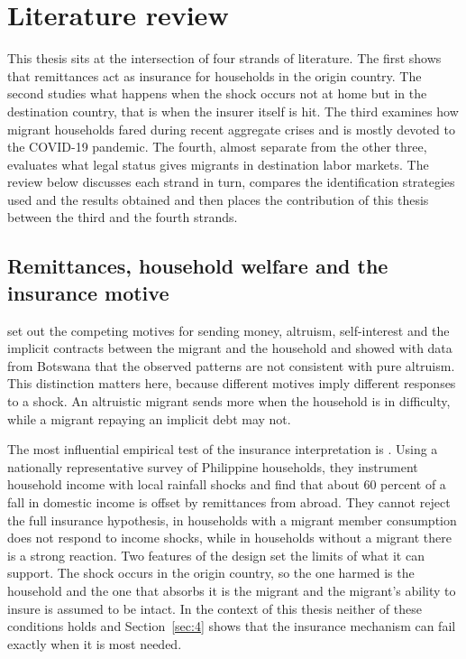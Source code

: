 \section{Literature review}\label{sec:2}

This thesis sits at the intersection of four strands of literature. The first shows that remittances act as insurance for households in the origin country. The second studies what happens when the shock occurs not at home but in the destination country, that is when the insurer itself is hit. The third examines how migrant households fared during recent aggregate crises and is mostly devoted to the COVID-19 pandemic. The fourth, almost separate from the other three, evaluates what legal status gives migrants in destination labor markets. The review below discusses each strand in turn, compares the identification strategies used and the results obtained and then places the contribution of this thesis between the third and the fourth strands.

\subsection{Remittances, household welfare and the insurance motive}\label{sec:2-1}

\cite{lucas1985} set out the competing motives for sending money, altruism, self-interest and the implicit contracts between the migrant and the household and showed with data from Botswana that the observed patterns are not consistent with pure altruism. This distinction matters here, because different motives imply different responses to a shock. An altruistic migrant sends more when the household is in difficulty, while a migrant repaying an implicit debt may not.

The most influential empirical test of the insurance interpretation is \cite{yang2007}. Using a nationally representative survey of Philippine households, they instrument household income with local rainfall shocks and find that about 60 percent of a fall in domestic income is offset by remittances from abroad. They cannot reject the full insurance hypothesis, in households with a migrant member consumption does not respond to income shocks, while in households without a migrant there is a strong reaction. Two features of the design set the limits of what it can support. The shock occurs in the origin country, so the one harmed is the household and the one that absorbs it is the migrant and the migrant's ability to insure is assumed to be intact. In the context of this thesis neither of these conditions holds and Section~\ref{sec:4} shows that the insurance mechanism can fail exactly when it is most needed.

